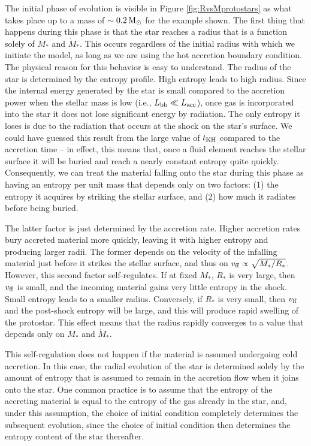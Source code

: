\documentclass[a4paper,10pt]{article}
\begin{document}
{\noindent}The initial phase of evolution is visible in Figure \ref{fig:RvsMprotostars} as what takes place up to a mass of $\sim0.2\,{\rm M_\odot}$ for the example shown. The first thing that happens during this phase is that the star reaches a radius that is a function solely of $M_*$ and $\dot{M}_*$. This occurs regardless of the initial radius with which we initiate the model, as long as we are using the hot accretion boundary condition. The physical reason for this behavior is easy to understand. The radius of the star is determined by the entropy profile. High entropy leads to high radius. Since the internal energy generated by the star is small compared to the accretion power when the stellar mass is low (i.e., $L_{\rm bb}\ll L_{\rm acc}$), once gas is incorporated into the star it does not lose significant energy by radiation. The only entropy it loses is due to the radiation that occurs at the shock on the star's surface. We could have guessed this result from the large value of $t_{\rm KH}$ compared to the accretion time -- in effect, this means that, once a fluid element reaches the stellar surface it will be buried and reach a nearly constant entropy quite quickly. Consequently, we can treat the material falling onto the star during this phase as having an entropy per unit mass that depends only on two factors: (1) the entropy it acquires by striking the stellar surface, and (2) how much it radiates before being buried.

{\noindent}The latter factor is just determined by the accretion rate. Higher accretion rates bury accreted material more quickly, leaving it with higher entropy and producing larger radii. The former depends on the velocity of the infalling material just before it strikes the stellar surface, and thus on $v_{\rm ff} \propto \sqrt{M_*/R_*}$. However, this second factor self-regulates. If at fixed $M_*$, $R_*$ is very large, then $v_{\rm ff}$ is small, and the incoming material gains very little entropy in the shock. Small entropy leads to a smaller radius. Conversely, if $R_*$ is very small, then $v_{\rm ff}$ and the post-shock entropy will be large, and this will produce rapid swelling of the protostar. This effect means that the radius rapidly converges to a value that depends only on $M_*$ and
$\dot{M}_*$.

{\noindent}This self-regulation does not happen if the material is assumed undergoing cold accretion. In this case, the radial evolution of the star is determined solely by the amount of entropy that is assumed to remain in the accretion flow when it joins onto the star. One common practice is to assume that the entropy of the accreting material is equal to the entropy of the gas already in the star, and, under this assumption, the choice of initial condition completely determines the subsequent evolution, since the choice of initial condition then determines the entropy content of the star thereafter.
\end{document}
